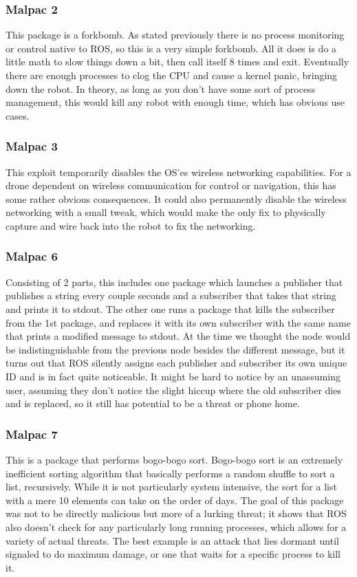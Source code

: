 \documentclass[IEEEtran,letterpaper,10pt,notitlepage,draftclsnofoot,onecolumn]{article}
\begin{document}
\subsubsection{Malpac 2}
This package is a forkbomb. 
As stated previously there is no process monitoring or control native to ROS, so this is a very simple forkbomb. All it does is do a little math to slow things down a bit, then call itself 8 times and exit. 
Eventually there are enough processes to clog the CPU and cause a kernel panic, bringing down the robot. 
In theory, as long as you don’t have some sort of process management, this would kill any robot with enough time, which has obvious use cases.

\subsubsection{Malpac 3}
This exploit temporarily disables the OS’es wireless networking capabilities. 
For a drone dependent on wireless communication for control or navigation, this has some rather obvious consequences. 
It could also permanently disable the wireless networking with a small tweak, which would make the only fix to physically capture and wire back into the robot to fix the networking. 

\subsubsection{Malpac 6}
Consisting of 2 parts, this includes one package which launches a publisher that publishes a string every couple seconds and a subscriber that takes that string and prints it to stdout. 
The other one runs a package that kills the subscriber from the 1st package, and replaces it with its own subscriber with the same name that prints a modified message to stdout. 
At the time we thought the node would be indistinguishable from the previous node besides the different message, but it turns out that ROS silently assigns each publisher and subscriber its own unique ID and is in fact quite noticeable. 
It might be hard to notice by an unassuming user, assuming they don’t notice the slight hiccup where the old subscriber dies and is replaced, so it still has potential to be a threat or phone home.

\subsubsection{Malpac 7}
This is a package that performs bogo-bogo sort. \cite{bogo}
Bogo-bogo sort is an extremely inefficient sorting algorithm that basically performs a random shuffle to sort a list, recursively. 
While it is not particularly system intensive, the sort for a list with a mere 10 elements can take on the order of days. 
The goal of this package was not to be directly malicious but more of a lurking threat; it shows that ROS also doesn’t check for any particularly long running processes, which allows for a variety of actual threats. 
The best example is an attack that lies dormant until signaled to do maximum damage, or one that waits for a specific process to kill it. 
\end{document}
